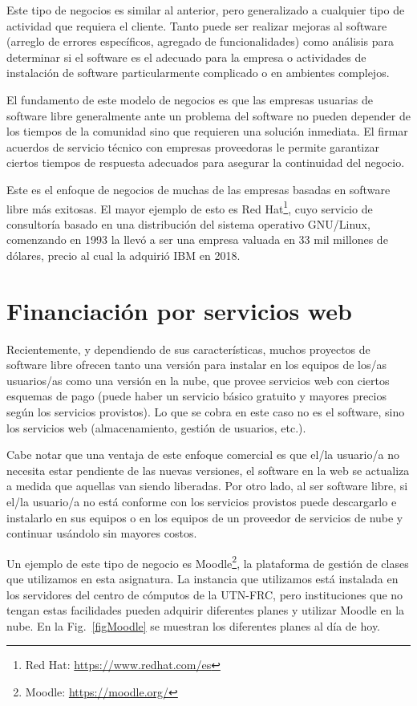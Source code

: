 Este tipo de negocios es similar al anterior, pero generalizado a cualquier tipo de actividad que requiera el cliente. Tanto puede ser realizar mejoras al software (arreglo de errores específicos, agregado de funcionalidades) como análisis para determinar si el software es el adecuado para la empresa o actividades de instalación de software particularmente complicado o en ambientes complejos.

El fundamento de este modelo de negocios es que las empresas usuarias de software libre generalmente ante un problema del software no pueden depender de los tiempos de la comunidad sino que requieren una solución inmediata. El firmar acuerdos de servicio técnico con empresas proveedoras le permite garantizar ciertos tiempos de respuesta adecuados para asegurar la continuidad del negocio.

Este es el enfoque de negocios de muchas de las empresas basadas en software libre más exitosas. El mayor ejemplo de esto es Red Hat\footnote{Red Hat: \url{https://www.redhat.com/es}}, cuyo servicio de consultoría basado en una distribución del sistema operativo GNU/Linux, comenzando en 1993 la llevó a ser una empresa valuada en 33 mil millones de dólares, precio al cual la adquirió IBM en 2018.
 
\section{Financiación por servicios web}

Recientemente, y dependiendo de sus características, muchos proyectos de software libre ofrecen tanto una versión para instalar en los equipos de los/as usuarios/as como una versión en la nube, que provee servicios web con ciertos esquemas de pago (puede haber un servicio básico gratuito y mayores precios según los servicios provistos). Lo que se cobra en este caso no es el software, sino los servicios web (almacenamiento, gestión de usuarios, etc.).

Cabe notar que una ventaja de este enfoque comercial es que el/la usuario/a no necesita estar pendiente de las nuevas versiones, el software en la web se actualiza a medida que aquellas van siendo liberadas. Por otro lado, al ser software libre, si el/la usuario/a no está conforme con los servicios provistos puede descargarlo e instalarlo en sus equipos o en los equipos de un proveedor de servicios de nube y continuar usándolo sin mayores costos.

Un ejemplo de este tipo de negocio es Moodle\footnote{Moodle: \url{https://moodle.org/}}, la plataforma de gestión de clases que utilizamos en esta asignatura. La instancia que utilizamos está instalada en los servidores del centro de cómputos de la UTN-FRC, pero instituciones que no tengan estas facilidades pueden adquirir diferentes planes y utilizar Moodle en la nube. En la Fig.~\ref{figMoodle} se muestran los diferentes planes al día de hoy. 

